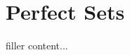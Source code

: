 \documentclass[../../templates/section]{subfiles}
\begin{document}
\section{Perfect Sets}\label{sec:perfect-sets}

filler content...
\end{document}
